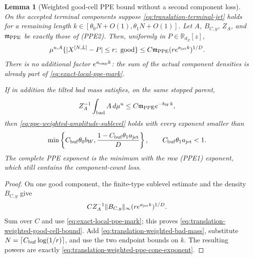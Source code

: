 \documentclass[11pt]{article}
\newtheorem{lemma}[theorem]{Lemma}
\begin{document}
\begin{lemma}[Weighted good-cell PPE bound without a second component loss]
\label{lem:translation-weighted-good-cell-PPE}
On the accepted terminal components suppose
\eqref{eq:translation-terminal-jet} holds for a remaining length
$k\in[\theta_0N+O(1),\theta_1N+O(1)]$.  Let $A$, $B_{C,y}$,
$Z_A$, and $\mathfrak m_{\rm PPE}$ be exactly those of
\textup{(PPE2)}.  Then, uniformly in
$P\in\mathbb R_{d_Z}[z]$,
\begin{equation}
\label{eq:translation-weighted-good-cell-bound}
 \mu^{u,A}\{|X^{[N,L]}-P|\le r;\ {\rm good}\}
 \le C\mathfrak m_{\rm PPE}
       (re^{a_{\rm jet}k})^{1/D}.
\end{equation}
There is no additional factor $e^{a_{\rm cmp}k}$: the sum of the actual
component densities is already part of
\eqref{eq:exact-local-ppe-mark}.

If in addition the tilted bad mass satisfies, on the same stopped parent,
\begin{equation}
\label{eq:translation-weighted-bad-mass}
 Z_A^{-1}\int_{\rm bad}A\,d\mu^u
 \le C\mathfrak m_{\rm PPE}e^{-b_Wk},
\end{equation}
then \eqref{eq:ppe-weighted-amplitude-sublevel} holds with every exponent
smaller than
\begin{equation}
\label{eq:translation-weighted-ppe-cone-exponent}
 \min\left\{C_{\rm buf}\theta_0b_W,
 \frac{1-C_{\rm buf}\theta_1a_{\rm jet}}D\right\},
 \qquad C_{\rm buf}\theta_1a_{\rm jet}<1.
\end{equation}
The complete PPE exponent is the minimum with the raw
\textup{(PPE1)} exponent, which still contains the component-count loss.
\end{lemma}

\begin{proof}
On one good component, the finite-type sublevel estimate and the density
$B_{C,y}$ give
\[
 C Z_A^{-1}\|B_{C,y}\|_\infty
 (re^{a_{\rm jet}k})^{1/D}.
\]
Sum over $C$ and use
\eqref{eq:exact-local-ppe-mark}; this proves
\eqref{eq:translation-weighted-good-cell-bound}.  Add
\eqref{eq:translation-weighted-bad-mass}, substitute
$N=\lceil C_{\rm buf}\log(1/r)\rceil$, and use the two endpoint bounds on
$k$.  The resulting powers are exactly
\eqref{eq:translation-weighted-ppe-cone-exponent}.
\end{proof}
\end{document}

